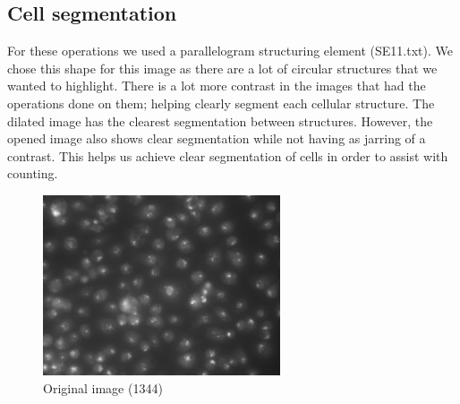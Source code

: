 \documentclass{article}
\begin{document}
\subsection{Cell segmentation}
\vspace{4mm}
\begin{flushleft}
For these operations we used a parallelogram structuring element (SE11.txt). We chose this shape for this image as there are a lot of circular structures that we wanted to highlight. There is a lot more contrast in the images that had the operations done on them; helping clearly segment each cellular structure.
\newline
The dilated image has the clearest segmentation between structures. However, the opened image also shows clear segmentation while not having as jarring of a contrast. This helps us achieve clear segmentation of cells in order to assist with counting.
\end{flushleft}
\begin{figure}[ht!]
    \centering
    \includegraphics[width=7cm]{nuclei.png}
    \caption{Original image (1344)}
    \label{fig:erosionSym}
\end{figure}
\end{document}
